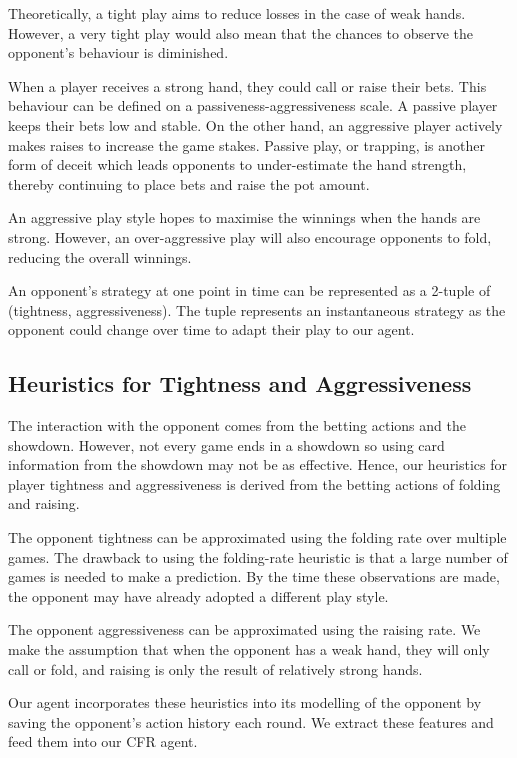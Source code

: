 \documentclass{article}
\begin{document}
Theoretically, a tight play aims to reduce losses in the case of weak hands. However, a very tight play would also mean that the chances to observe the opponent's behaviour is diminished.

When a player receives a strong hand, they could call or raise their bets. This behaviour can be defined on a passiveness-aggressiveness scale. A passive player keeps their bets low and stable. On the other hand, an aggressive player actively makes raises to increase the game stakes. Passive play, or trapping, is another form of deceit which leads opponents to under-estimate the hand strength, thereby continuing to place bets and raise the pot amount.

An aggressive play style hopes to maximise the winnings when the hands are strong. However, an over-aggressive play will also encourage opponents to fold, reducing the overall winnings.

An opponent's strategy at one point in time can be represented as a 2-tuple of (tightness, aggressiveness). The tuple represents an instantaneous strategy as the opponent could change over time to adapt their play to our agent.

\subsection{Heuristics for Tightness and Aggressiveness}
The interaction with the opponent comes from the betting actions and the showdown. However, not every game ends in a showdown so using card information from the showdown may not be as effective. Hence, our heuristics for player tightness and aggressiveness is derived from the betting actions of folding and raising.

The opponent tightness can be approximated using the folding rate over multiple games. The drawback to using the folding-rate heuristic is that a large number of games is needed to make a prediction. By the time these observations are made, the opponent may have already adopted a different play style.

The opponent aggressiveness can be approximated using the raising rate. We make the assumption that when the opponent has a weak hand, they will only call or fold, and raising is only the result of relatively strong hands.

Our agent incorporates these heuristics into its modelling of the opponent by saving the opponent's action history each round. We extract these features and feed them into our CFR agent.
\end{document}
